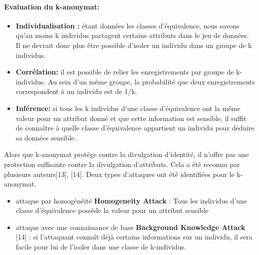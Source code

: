 \paragraph{Evaluation du k-anonymat:}  
\begin{itemize}
    \item \textbf{Individualisation :} étant données les classes d’équivalence, nous savons qu’au moins k individus partagent certains attributs dans le jeu de données. Il ne devrait donc plus être possible d’isoler un individu dans un groupe de k individus. 

    \item \textbf{Corrélation:} il est possible de relier les enregistrements par groupe de k-individus. Au sein d’un même groupe, la probabilité que deux enregistrements correspondent à un individu est de 1/k. 

    \item \textbf{Inférence:} si tous les k individus d’une classe d’équivalence ont la même valeur pour un attribut donné et que cette information est sensible, il suffit de connaître à quelle classe d’équivalence appartient un individu pour déduire sa données sensible. 
\end{itemize}
 
Alors que k-anonymat protège contre la divulgation d'identité, il n'offre pas une protection suffisante contre la divulgation d'attributs. Cela a été reconnu par plusieurs auteurs[13], [14]. Deux types d'attaques ont été identifiées pour le k-anonymat.
\begin{itemize}
    \item attaque par homogénéité \textbf{Homogeneity Attack} : Tous les individus d'une classe d'équivalence possède la valeur pour un attribut sensible
    \item  attaque avec une connaissance de base \textbf{Background Knowledge Attack} [14] : si l'attaquant connaît déjà certains informations sur un individu, il sera facile pour lui de l'isoler dans une classe de k-individus. 
\end{itemize} 
